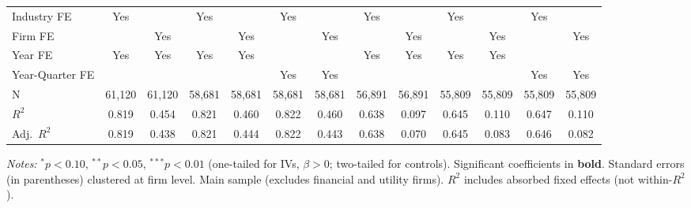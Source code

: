 \begin{landscape}
\begin{table}[H]
\begin{tabular}{lcccccccccccc}
Industry FE & Yes &  & Yes &  & Yes &  & Yes &  & Yes &  & Yes &  \\
Firm FE &  & Yes &  & Yes &  & Yes &  & Yes &  & Yes &  & Yes \\
Year FE & Yes & Yes & Yes & Yes &  &  & Yes & Yes & Yes & Yes &  &  \\
Year-Quarter FE &  &  &  &  & Yes & Yes &  &  &  &  & Yes & Yes \\
\midrule
N & 61,120 & 61,120 & 58,681 & 58,681 & 58,681 & 58,681 & 56,891 & 56,891 & 55,809 & 55,809 & 55,809 & 55,809 \\
$R^2$ & 0.819 & 0.454 & 0.821 & 0.460 & 0.822 & 0.460 & 0.638 & 0.097 & 0.645 & 0.110 & 0.647 & 0.110 \\
Adj.~$R^2$ & 0.819 & 0.438 & 0.821 & 0.444 & 0.822 & 0.443 & 0.638 & 0.070 & 0.645 & 0.083 & 0.646 & 0.082 \\
\bottomrule
\end{tabular}
\begin{minipage}{\linewidth}
\vspace{2pt}\scriptsize
\textit{Notes:} $^{*}p<0.10$, $^{**}p<0.05$, $^{***}p<0.01$ (one-tailed for IVs, $\beta > 0$; two-tailed for controls).
 Significant coefficients in \textbf{bold}.
 Standard errors (in parentheses) clustered at firm level.
 Main sample (excludes financial and utility firms).
 $R^2$ includes absorbed fixed effects (not within-$R^2$).
\end{minipage}
\end{table}
\end{landscape}